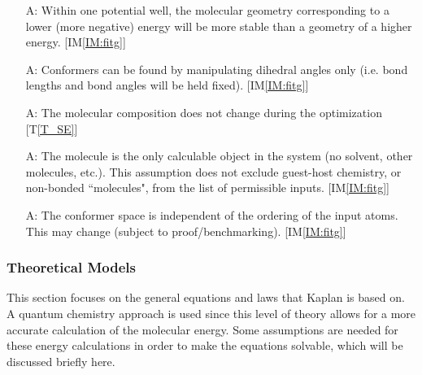 \documentclass[12pt]{article}
\newcommand{\tref}[1]{T\ref{#1}}
\newcounter{assumpnum} %
\newcommand{\iref}[1]{IM\ref{#1}}
\newcommand{\progname}{Kaplan} %
\begin{document}
\begin{itemize}
\item[A\refstepcounter{assumpnum}\theassumpnum \label{A:stability}:] Within one 
potential well, the molecular geometry corresponding to a lower (more negative) 
energy will be more stable than a geometry of a higher energy. [\iref{IM:fitg}]

\item[A\refstepcounter{assumpnum}\theassumpnum \label{A:dihedral-only}:] 
Conformers can be found by manipulating dihedral angles only (i.e. bond lengths 
and bond angles will be held fixed). [\iref{IM:fitg}]

\item[A\refstepcounter{assumpnum}\theassumpnum \label{A:fixed-mol}:] The 
molecular composition does not change during the 
optimization [\tref{T_SE}]

\item[A\refstepcounter{assumpnum}\theassumpnum \label{A:one-mol}:] The 
molecule is the only calculable object in the system (no solvent, other 
molecules, etc.). This assumption does not exclude guest-host chemistry, or 
non-bonded ``molecules", from the list of permissible inputs. [\iref{IM:fitg}]

\item[A\refstepcounter{assumpnum}\theassumpnum \label{A:atom-ordering}:] The 
conformer space is independent of the ordering of the input atoms. This may 
change (subject to proof/benchmarking). [\iref{IM:fitg}]


\end{itemize}

\subsubsection{Theoretical Models}\label{sec_theoretical}

This section focuses on the general equations and laws that \progname{} is based
on. A quantum chemistry approach is used since this level of theory allows for 
a more accurate calculation of the molecular energy. Some assumptions are 
needed for these energy calculations in order to make the equations solvable, 
which will be discussed briefly here.


~\newline
\end{document}
